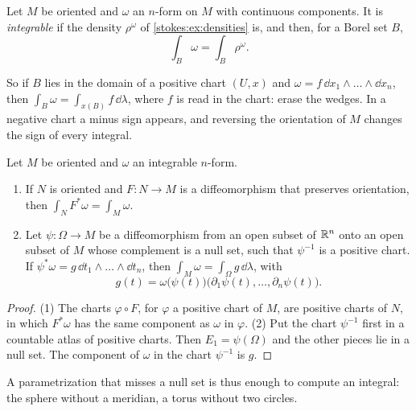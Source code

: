 \begin{notechapter}
\begin{definition}
\label{stokes:def:integral}
Let $M$ be oriented and $\omega$ an $n$-form on $M$ with continuous
components. It is \emph{integrable} if the density $\rho^\omega$ of
\cref{stokes:ex:densities} is, and then, for a Borel set $B$,
\[
  \int_B\omega = \int_B\rho^\omega .
\]
\end{definition}

So if $B$ lies in the domain of a positive chart $(U, x)$ and
$\omega = f\,\dd x_1\wedge\dots\wedge\dd x_n$, then
$\int_B\omega = \int_{x(B)}f\,\dd\lambda$, where $f$ is read in the
chart: erase the wedges. In a negative chart a minus sign appears, and
reversing the orientation of $M$ changes the sign of every integral.

\begin{proposition}\label{stokes:prop:computing}
Let $M$ be oriented and $\omega$ an integrable $n$-form.
\begin{enumerate}[nosep]
  \item If $N$ is oriented and $F:N\to M$ is a diffeomorphism that
        preserves orientation, then $\int_NF^*\omega = \int_M\omega$.
  \item Let $\psi:\Omega\to M$ be a diffeomorphism from an open subset
        of $\mathbb{R}^n$ onto an open subset of $M$ whose complement is a null
        set, such that $\psi^{-1}$ is a positive chart. If
        $\psi^*\omega = g\,\dd t_1\wedge\dots\wedge\dd t_n$, then
        $\int_M\omega = \int_\Omega g\,\dd\lambda$, with
        \[
          g(t) = \omega\bigl(\psi(t)\bigr)\bigl(\partial_1\psi(t),\dots,
          \partial_n\psi(t)\bigr) .
        \]
\end{enumerate}
\end{proposition}

\begin{proof}
(1) The charts $\varphi\circ F$, for $\varphi$ a positive chart of $M$,
are positive charts of $N$, in which $F^*\omega$ has the same component
as $\omega$ in $\varphi$. (2) Put the chart $\psi^{-1}$ first in a
countable atlas of positive charts. Then $E_1 = \psi(\Omega)$ and the
other pieces lie in a null set. The component of $\omega$ in the chart
$\psi^{-1}$ is $g$.
\end{proof}

A parametrization that misses a null set is thus enough to compute an
integral: the sphere without a meridian, a torus without two circles.


\end{notechapter}
